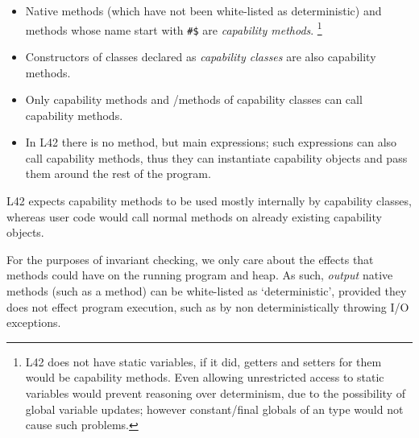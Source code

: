 \begin{itemize}
\item Native methods (which have not been white-listed as deterministic) and methods whose name start with \texttt{\#\$} are \emph{capability methods}.%
\footnote{
L42 does not have static variables, if it did, getters and setters for them would be capability methods.
Even allowing unrestricted access to \Q@imm@
static variables would prevent reasoning over
determinism, due to the possibility of global variable
updates; however constant/final globals of an 
\Q@imm@ type would not cause such problems.
}
\item Constructors of classes declared as \emph{capability classes} are also capability methods.
\item Only capability methods and \Q@mut@/\Q@capsule@ methods of capability classes can call capability methods.
\item In L42 there is no \Q@main@ method, but main expressions; such expressions can also call capability methods, thus they can instantiate capability objects and pass them around the rest of the program.

\end{itemize}
L42 expects capability methods to be used mostly internally by capability classes, whereas user code would call normal methods on already existing capability objects.

For the purposes of invariant checking, we only care about the effects that methods could have on the running program and heap. As such, \emph{output} native methods (such as a \Q@print@ method) can be white-listed as `deterministic', provided they does not effect program execution, such as by non deterministically throwing I/O exceptions.


